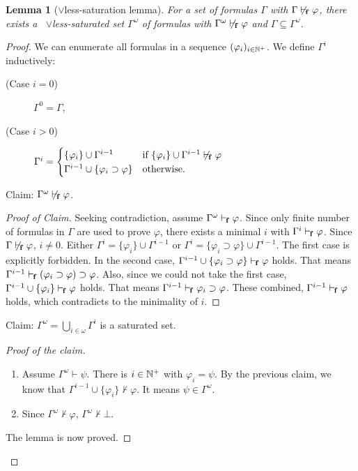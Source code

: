 \documentclass[doctor]{iscs-thesis}
\newtheorem{lemma}{Lemma}
\begin{document}
\begin{lemma}[$\vee$less-saturation lemma]
\label{nsaturation}
 For a set of formulas $\Gamma$ with $\Gamma\not\vdash_{\kern -1pt\mathbf f}\varphi$, there exists a~%
 $\vee$less-saturated
 set $\Gamma^\omega$ of formulas with $\Gamma^\omega\not\vdash_{\kern -1pt\mathbf f}\varphi$
 and $\Gamma\subseteq \Gamma^\omega$.
\end{lemma}
\begin{proof}
 We can enumerate all formulas in a sequence $(\varphi_i)_{i\in{\mathbb N}^{+}}$.
 We define $\Gamma^i$ inductively:
\begin{description}
 \item[(Case $i = 0$)] $\Gamma^0 = \Gamma$,
 \item[(Case $i > 0$)] 
	    $\Gamma^i = \begin{cases}
			 \{\varphi_{i}\}\cup \Gamma^{i-1} &\text{if }
			 \{\varphi_{i}\}\cup\Gamma^{i-1}\not\vdash_{\kern -1pt\mathbf f}\varphi \\
			 \Gamma^{i-1} \cup\{\varphi_{i}\supset\varphi\} & \text {otherwise.}
			\end{cases}$
\end{description}

Claim: 
 $\Gamma^\omega \not\vdash_{\kern -1pt\mathbf f} \varphi$.
\begin{proof}[Proof of Claim]
Seeking contradiction, assume $\Gamma^\omega\vdash_{\kern -1pt\mathbf f}\varphi$. 
Since only finite number of formulas in $\Gamma$ are used to prove $\varphi$,
there exists 
 a minimal $i$ with
 $\Gamma^i\vdash_{\kern -1pt\mathbf f}\varphi$. Since $\Gamma\not\vdash_{\kern -1pt\mathbf f}\varphi$, $i\neq 0$.
 Either $\Gamma^i = \{\varphi_{i}\} \cup \Gamma^{i-1}$ 
or $\Gamma^i = \{\varphi_{i}\supset\varphi\}\cup \Gamma^{i-1}$\kern -2pt.
 The first case is explicitly forbidden.
 In the second case, $\Gamma^{i-1}\cup\{\varphi_{i}\supset\varphi\}\vdash_{\kern -1pt\mathbf f} \varphi$ holds.
 That means $\Gamma^{i-1}\vdash_{\kern -1pt\mathbf f} (\varphi_{i}\supset\varphi)\supset \varphi$.
 Also, since we could not take the first case, $\Gamma^{i-1}\cup\{\varphi_{i}\}\vdash_{\kern -1pt\mathbf f} \varphi$
 holds. That means $\Gamma^{i-1}\vdash_{\kern -1pt\mathbf f} \varphi_{i}\supset\varphi$.
 These combined, $\Gamma^{i-1}\vdash_{\kern -1pt\mathbf f}\varphi$ holds, which contradicts to the minimality of
 $i$.
\end{proof}
Claim:
$\Gamma^\omega = \bigcup_{i\in\omega} \Gamma^i$ is a saturated set.
\begin{proof}[Proof of the claim]
\begin{enumerate}
 \item  Assume $\Gamma^\omega \vdash \psi$. There is $i\in{\mathbb N}^{+}$ with $\varphi_i = \psi$.
	By the previous claim, we know that
	$\Gamma^{i-1}\cup\{\varphi_i\}\not\vdash\varphi$. It means
 $\psi\in\Gamma^\omega$.
 \item Since $\Gamma^\omega\not\vdash\varphi$, $\Gamma^\omega\not\vdash\bot$.
\end{enumerate}
 The lemma is now proved.
\end{proof}
\end{proof}
\end{document}
